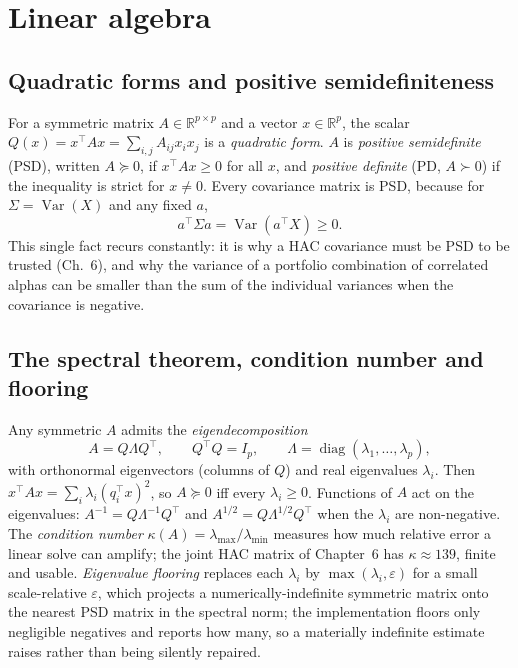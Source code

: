 \section{Linear algebra}\label{prelim-linalg}

\subsection{Quadratic forms and positive semidefiniteness}

For a symmetric matrix $A\in\mathbb{R}^{p\times p}$ and a vector
$x\in\mathbb{R}^{p}$, the scalar $Q(x)=x^{\top}Ax=\sum_{i,j}A_{ij}x_ix_j$
is a \emph{quadratic form}. $A$ is \emph{positive semidefinite} (PSD),
written $A\succeq 0$, if $x^{\top}Ax\ge 0$ for all $x$, and
\emph{positive definite} (PD, $A\succ 0$) if the inequality is strict for
$x\ne 0$. Every covariance matrix is PSD, because for
$\Sigma=\operatorname{Var}(X)$ and any fixed $a$,
\begin{equation}
a^{\top}\Sigma a=\operatorname{Var}(a^{\top}X)\ge 0 .
\end{equation}
This single fact recurs constantly: it is why a HAC covariance must be
PSD to be trusted (Ch.~6), and why the variance of a portfolio combination
of correlated alphas can be smaller than the sum of the individual
variances when the covariance is negative.

\subsection{The spectral theorem, condition number and flooring}

Any symmetric $A$ admits the \emph{eigendecomposition}
\begin{equation}
A=Q\Lambda Q^{\top},\qquad Q^{\top}Q=I_p,\qquad
\Lambda=\operatorname{diag}(\lambda_1,\dots,\lambda_p),
\end{equation}
with orthonormal eigenvectors (columns of $Q$) and real eigenvalues
$\lambda_i$. Then $x^{\top}Ax=\sum_i\lambda_i(q_i^{\top}x)^2$, so
$A\succeq 0$ iff every $\lambda_i\ge 0$. Functions of $A$ act on the
eigenvalues: $A^{-1}=Q\Lambda^{-1}Q^{\top}$ and
$A^{1/2}=Q\Lambda^{1/2}Q^{\top}$ when the $\lambda_i$ are non-negative.
The \emph{condition number} $\kappa(A)=\lambda_{\max}/\lambda_{\min}$
measures how much relative error a linear solve can amplify; the joint HAC
matrix of Chapter~6 has $\kappa\approx 139$, finite and usable.
\emph{Eigenvalue flooring} replaces each $\lambda_i$ by
$\max(\lambda_i,\varepsilon)$ for a small scale-relative $\varepsilon$,
which projects a numerically-indefinite symmetric matrix onto the nearest
PSD matrix in the spectral norm; the implementation floors only negligible
negatives and reports how many, so a materially indefinite estimate raises
rather than being silently repaired.

